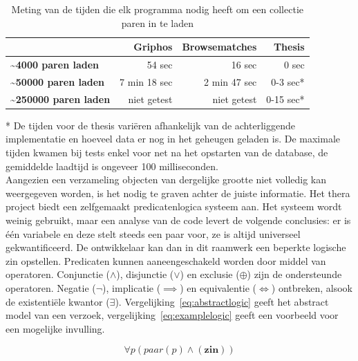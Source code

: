 \begin{table}[h]
	\begin{center}
		\begin{tabular}{|l|r|r|r|}
		    \rowcolor{gray!75}
		    \hline
		    & \textbf{Griphos} &  \textbf{Browsematches} & \textbf{Thesis} \\
		    \hline
		    \textbf{\textasciitilde 4000 paren laden} & 54 sec & 16 sec & 0 sec \\
		    \textbf{\textasciitilde 50000 paren laden} & 7 min 18 sec & 2 min 47 sec  & 0-3 sec* \\
		    \textbf{\textasciitilde 250000 paren laden} & niet getest & niet getest & 0-15 sec* \\
		    \hline
		\end{tabular}
	\end{center}
	\caption{Meting van de tijden die elk programma nodig heeft om een collectie paren in te laden}
	\label{table:matchesloadspeed}
\end{table}

* De tijden voor de thesis vari\"eren afhankelijk van de achterliggende implementatie en hoeveel data er nog in het geheugen geladen is. De maximale tijden kwamen bij tests enkel voor net na het opstarten van de database, de gemiddelde laadtijd is ongeveer 100 milliseconden.\\

Aangezien een verzameling objecten van dergelijke grootte niet volledig kan weergegeven worden, is het nodig te graven achter de juiste informatie. Het thera project biedt een zelfgemaakt predicatenlogica systeem aan. Het systeem wordt weinig gebruikt, maar een analyse van de code levert de volgende conclusies: er is \'e\'en variabele en deze stelt steeds een paar voor, ze is altijd universeel gekwantificeerd. De ontwikkelaar kan dan in dit raamwerk een beperkte logische zin opstellen. Predicaten kunnen aaneengeschakeld worden door middel van operatoren. Conjunctie ($\land$), disjunctie ($\lor$) en exclusie ($\oplus$) zijn de ondersteunde operatoren. Negatie ($\neg$), implicatie ($\implies$) en equivalentie ($\iff$) ontbreken, alsook de existenti\"ele kwantor ($\exists$). Vergelijking~\ref{eq:abstractlogic} geeft het abstract model van een verzoek, vergelijking~\ref{eq:examplelogic} geeft een voorbeeld voor een mogelijke invulling.

\begin{equation}
\label{eq:abstractlogic}
	\forall p (paar(p) \land (\mathbf{zin}))
\end{equation}

